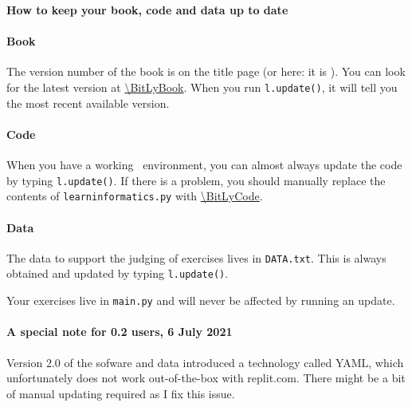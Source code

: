 
\begin{tcolorbox}
  {\color{BrickRed}\large\bfseries How to keep your book, code and data up to date}

  \paragraph{Book} The version number of the book is on the title page (or here: it is
  \BookVersionString). You can look for the latest version at \url{\BitLyBook}.
  When you run \texttt{l.update()}, it will tell you the most recent available version.

  \paragraph{Code} When you have a working \learninformatics\ environment, you can almost
  always update the code by typing \texttt{l.update()}. If there is a problem, you should
  manually replace the contents of \texttt{learninformatics.py} with
  \url{\BitLyCode}.

  \paragraph{Data} The data to support the judging of exercises lives in
  \texttt{DATA.txt}. This is always obtained and updated by typing \texttt{l.update()}.

  \bigskip
  Your exercises live in \texttt{main.py} and will never be affected by
  running an update.
\end{tcolorbox}

\paragraph{A special note for 0.2 users, 6 July 2021} Version 2.0 of the sofware and data
introduced a technology called YAML, which unfortunately does not work out-of-the-box with
replit.com. There might be a bit of manual updating required as I fix this issue.

